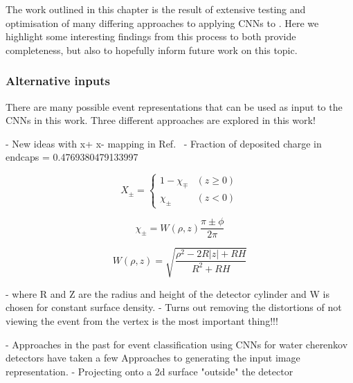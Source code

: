 The work outlined in this chapter is the result of extensive testing and optimisation of many
differing approaches to applying CNNs to \chips. Here we highlight some interesting findings from
this process to both provide completeness, but also to hopefully inform future work on this topic.

\subsubsection*{Alternative inputs} %

There are many possible event representations that can be used as input to the CNNs in this work.
Three different approaches are explored in this work!

- New ideas with x+ x- mapping in Ref.~\cite{berns2020}
- Fraction of deposited charge in endcaps = 0.4769380479133997

\begin{equation} %
    X_{\pm}=
    \begin{cases}
        1-\chi_{\mp} & (z \geq 0) \\
        \chi_{\pm}   & (z < 0)
    \end{cases}
    \label{eq:iso_case}
\end{equation}

\begin{equation} %
    \chi_{\pm}=W(\rho,z)\frac{\pi\pm\phi}{2\pi}
    \label{eq:iso_main}
\end{equation}

\begin{equation} %
    W(\rho,z)=\sqrt{\frac{\rho^{2}-2R|z|+RH}{R^{2}+RH}}
    \label{eq:iso_part}
\end{equation}

- where R and Z are the radius and height of the detector cylinder and W is chosen for constant
surface density.
- Turns out removing the distortions of not viewing the event from the vertex is the most
important thing!!!

- Approaches in the past for event classification using CNNs for water cherenkov detectors have
taken a few Approaches to generating the input image representation.
- Projecting onto a 2d surface "outside" the detector

